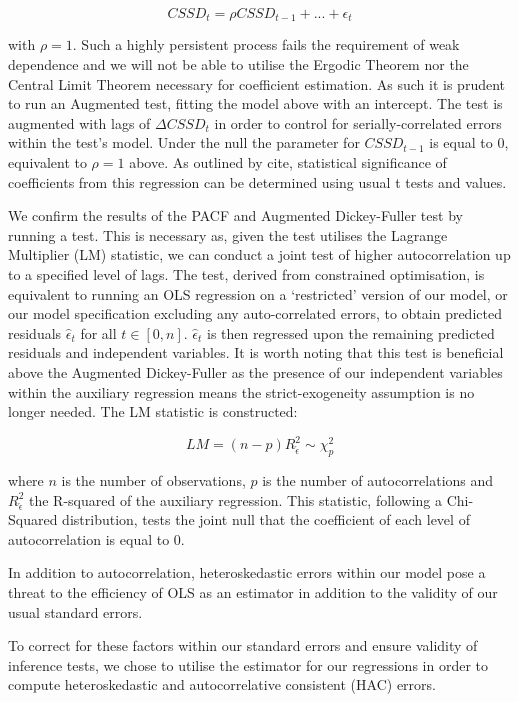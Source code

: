 \documentclass[12pt]{article}
\numberwithin{table}{section}   %
\begin{document}
$$
CSSD_t=\rho{CSSD_{t-1}}+...+\epsilon_t
$$

with $\rho=1$. Such a highly persistent process fails the requirement of weak dependence and we will not be able to utilise the Ergodic Theorem nor the Central Limit Theorem necessary for coefficient estimation. As such it is prudent to run an Augmented \citet{dfuller} test, fitting the model above with an intercept. The test is augmented with lags of $\Delta{CSSD_t}$ in order to control for serially-correlated errors within the test’s model. Under the null the parameter for $CSSD_{t-1}$ is equal to 0, equivalent to $\rho=1$ above. As outlined by cite, statistical significance of coefficients from this regression can be determined using usual t tests and values.

We confirm the results of the PACF and Augmented Dickey-Fuller test by running a \citet{breusch} \citet{godfrey} test. This is necessary as, given the test utilises the Lagrange Multiplier (LM) statistic, we can conduct a joint test of higher autocorrelation up to a specified level of lags. The test, derived from constrained optimisation, is equivalent to running an OLS regression on a ‘restricted’ version of our model, or our model specification excluding any auto-correlated errors, to obtain predicted residuals $\hat{\epsilon}_t$ for all $t\in[0,n]$. $\hat{\epsilon}_t$ is then regressed upon the remaining predicted residuals and independent variables. It is worth noting that this test is beneficial above the Augmented Dickey-Fuller as the presence of our independent variables within the auxiliary regression means the strict-exogeneity assumption is no longer needed. The LM statistic is constructed:

$$
LM=(n-p)R^2_{\hat{\epsilon}} \sim\chi^2_p
$$

where $n$ is the number of observations, $p$ is the number of autocorrelations and $R^2_{\hat{\epsilon}}$ the R-squared of the auxiliary regression. This statistic, following a Chi-Squared distribution, tests the joint null that the coefficient of each level of autocorrelation is equal to 0.

In addition to autocorrelation, heteroskedastic errors within our model pose a threat to the efficiency of OLS as an estimator in addition to the validity of our usual standard errors.

To correct for these factors within our standard errors and ensure validity of inference tests, we chose to utilise the \citet{newey} estimator for our regressions in order to compute heteroskedastic and autocorrelative consistent (HAC) errors.
\end{document}
